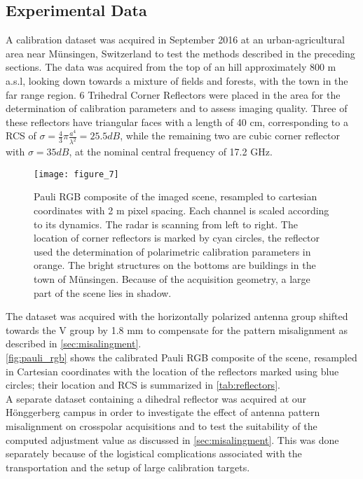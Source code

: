 \subsection{Experimental Data}\label{sec:data}
A calibration dataset was acquired in September 2016 at an urban-agricultural area near M\"{u}nsingen, Switzerland to test the methods described in the preceding sections. The data was acquired from the top of an hill approximately 800 m a.s.l, looking down towards a mixture of fields and forests, with the town in the far range region. 6 Trihedral Corner Reflectors were placed in the area for the determination of calibration parameters and to assess imaging quality. Three of these reflectors have triangular faces with a length of 40 cm, corresponding to a RCS of $\sigma=\frac{4}{3}\pi \frac{a^4}{\lambda^2}=25.5 dB$, while the remaining two are cubic corner reflector with $\sigma= 35 dB$, at the nominal central frequency of 17.2 GHz.
	\begin{figure*}
		\centering
		\texttt{[image: figure\_7]}
		\caption{Pauli RGB composite of the imaged scene, resampled to cartesian coordinates with 2 m pixel spacing. Each channel is scaled according to its dynamics. The radar is scanning from left to right. The location of corner reflectors is marked by cyan circles, the reflector used the determination of polarimetric calibration parameters in orange. The bright structures on the bottoms are buildings in the town of M\"{u}nsingen. Because of the acquisition geometry, a large part of the scene lies in shadow.}
		\label{fig:pauli_rgb}
	\end{figure*}
The dataset was acquired with the horizontally polarized antenna group shifted towards the V group by 1.8 mm to compensate for the pattern misalignment as described in \autoref{sec:misalingment}.\\
\autoref{fig:pauli_rgb} shows the calibrated Pauli RGB composite of the scene, resampled in Cartesian coordinates with the location of the reflectors marked using blue circles; their location and RCS is summarized in \autoref{tab:reflectors}.\\
A separate dataset containing a dihedral reflector was acquired at our H\"{o}nggerberg campus in order to investigate the effect of antenna pattern misalignment on crosspolar acquisitions and to test the suitability of the computed adjustment value as discussed in \autoref{sec:misalingment}. This was done separately because of the logistical complications associated with the transportation and the setup of large calibration targets.

